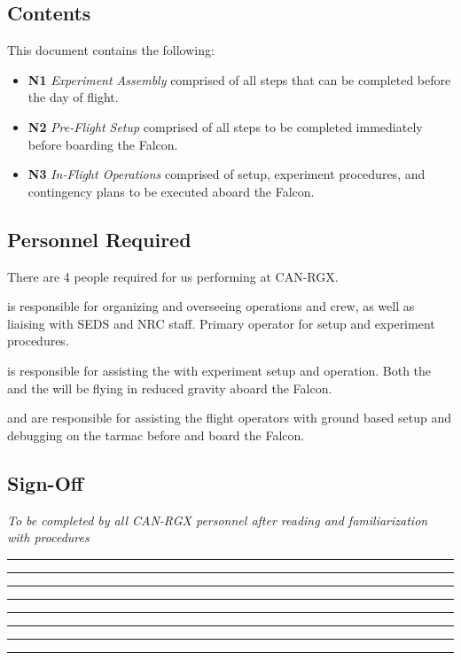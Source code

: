 \subsection{Contents}
This document contains the following:
\begin{itemize}
    \item \textbf{N1} \textit{Experiment Assembly} comprised of all steps that can be completed before the day of flight.
    \item \textbf{N2} \textit{Pre-Flight Setup} comprised of all steps to be completed immediately before boarding the Falcon.
    \item \textbf{N3} \textit{In-Flight Operations} comprised of setup, experiment procedures, and contingency plans to be executed aboard the Falcon.
\end{itemize}

\subsection{Personnel Required}
There are 4 people required for us performing at CAN-RGX.
\begin{checklist}
    \item \commanderfull{} is responsible for organizing and overseeing operations and crew, as well as liaising with SEDS and NRC staff. Primary operator for setup and experiment procedures.
    \item \payloadfull{} is responsible for assisting the \commander{} with experiment setup and operation. Both the \payload{} and the \commander{} will be flying in reduced gravity aboard the Falcon.
    \item \mspecpri{} and \mspecsec{} are responsible for assisting the flight operators with ground based setup and debugging on the tarmac before \commander{} and \payload{} board the Falcon.
\end{checklist}
\setcounter{checklistnum}{0}

\subsection{Sign-Off}
\textit{To be completed by all CAN-RGX personnel after reading and familiarization with procedures}
\begin{checklist}
    \item \commanderfull      \tabto{25em}\rule{10em}{0.4pt}\hspace{5em}\rule{10em}{0.4pt}
    \item \payloadfull        \tabto{25em}\rule{10em}{0.4pt}\hspace{5em}\rule{10em}{0.4pt}
    \item \mspecprifull       \tabto{25em}\rule{10em}{0.4pt}\hspace{5em}\rule{10em}{0.4pt}
    \item \mspecsecfull       \tabto{25em}\rule{10em}{0.4pt}\hspace{5em}\rule{10em}{0.4pt}
\end{checklist}
\setcounter{checklistnum}{0}

